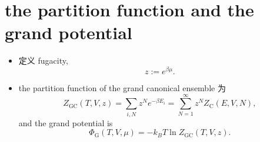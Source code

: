 \section{the partition function and the grand potential}
\begin{itemize}
	\item 定义 fugacity,
	\begin{equation}
		z := e^{\beta \mu}.
	\end{equation}
	
	\item the partition function of the grand canonical ensemble 为
	\begin{equation}
		Z_\text{GC}(T, V, z) = \sum_{i, N} z^N e^{- \beta E_i} = \sum_{N = 1}^\infty z^N Z_\text{C}(E, V, N),
	\end{equation}
	and the grand potential is
	\begin{equation}
		\Phi_\text{G}(T, V, \mu) = - k_B T \ln Z_\text{GC}(T, V, z).
	\end{equation}
\end{itemize}

